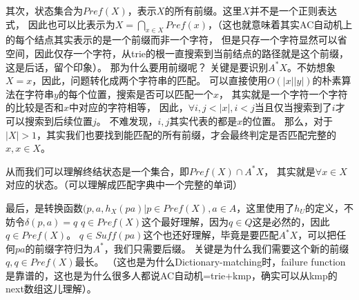 \documentclass[UTF8]{ctexart}
\theoremstyle{definition}
\theoremstyle{remark}
\numberwithin{equation}{subsection}
\newcommand{\Suff}{\textit{Suff}}
\begin{document}
	其次，状态集合为$Pref(X)$，表示$X$的所有前缀。这里$X$并不是一个正则表达式，
	因此也可以比表示为$X = \bigcap_{x \in X} Pref(x)$，（这也就意味着其实AC自动机上的每个结点其实表示的是一个前缀而非一个字符，
	但是只存一个字符显然可以省空间，因此仅存一个字符，从trie的根一直搜索到当前结点的路径就是这个前缀，这是后话，留个印象）。
	那为什么要用前缀呢？
	关键是要识别$A^*X$。不妨想象$X={x}$，因此，问题转化成两个字符串的匹配。
	可以直接使用$O(|x||y|)$的朴素算法在字符串$y$的每个位置，搜索是否可以匹配一个$x$，
	其实就是一个字符一个字符的比较是否和$x$中对应的字符相等，
	因此，$\forall i,j < |x|, i<j$当且仅当搜索到了$i$才可以搜索到后续位置$j$。
	不难发现，$i,j$其实代表的都是$x$的位置。
	那么，对于$|X|>1$，其实我们也要找到能匹配的所有前缀，才会最终判定是否匹配完整的$x, x \in X$。
	
	从而我们可以理解终结状态是一个集合，即$Pref(X) \cap A^*X$，
	其实就是$\forall x \in X$对应的状态。（可以理解成匹配字典中一个完整的单词）
	
	最后，是转换函数${(p,a,h_X(pa) | p \in Pref(X), a \in A}$，这里使用了$h_U$的定义，不妨令$\delta(p,a)=q$
	$q \in Pref(X)$这个最好理解，因为$q \in Q$这是必然的，因此$q \in Pref(X)$。
	$q \in \Suff(pa)$这个也还好理解，毕竟是要匹配$A^*X$，可以把任何$pa$的前缀字符归为$A^*$，我们只需要后缀。
	关键是为什么我们需要这个新的前缀$q, q \in Pref(X)$最长。
	（这也是为什么Dictionary-matching时，failure function是靠谱的，这也是为什么很多人都说AC自动机=trie+kmp，确实可以从kmp的next数组这儿理解）。
	
\end{document}
